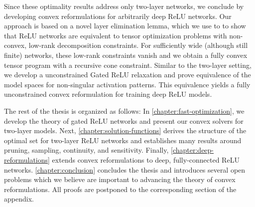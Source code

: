 Since these optimality results address only two-layer networks, we conclude by
developing convex reformulations for arbitrarily deep ReLU networks.
Our approach is based on a novel layer elimination lemma, which we use to
to show that ReLU networks are equivalent to tensor optimization problems with
non-convex, low-rank decomposition constraints.
For sufficiently wide (although still finite) networks, these low-rank
constraints vanish and we obtain a fully convex tensor program with a
recursive cone constraint.
Similar to the two-layer setting, we develop a unconstrained Gated ReLU
relaxation and prove equivalence of the model spaces for non-singular
activation patterns.
This equivalence yields a fully unconstrained convex reformulation for
training deep ReLU models.

The rest of the thesis is organized as follows:
In \cref{chapter:fast-optimization}, we develop the theory of gated ReLU
networks and present our convex solvers for two-layer models.
Next, \cref{chapter:solution-functions} derives the structure of the optimal
set for two-layer ReLU networks and establishes many results around pruning,
sampling, continuity, and sensitivity.
Finally, \cref{chapter:deep-reformulations} extends convex reformulations
to deep, fully-connected ReLU networks.
\cref{chapter:conclusion} concludes the thesis and introduces several open
problems which we believe are important to advancing the theory of convex
reformulations.
All proofs are postponed to the corresponding section of the appendix.

